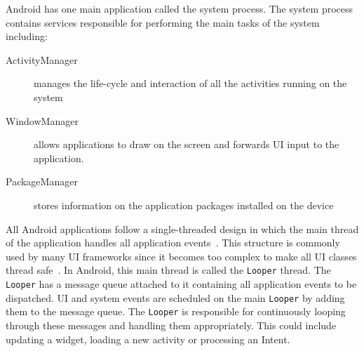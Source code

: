 \documentclass{acm_proc_article-sp}
\begin{document}
Android has one main application called the system process. The system process contains services responsible for performing the main
tasks of the system including:
\vspace{-10pt}
\begin{description}
 \item [ActivityManager] manages the life-cycle and interaction of all the activities running on the system
 \item [WindowManager] allows applications to draw on the screen and forwards UI input to the application.
 \item [PackageManager] stores information on the application packages installed on the device
\end{description}
\vspace{-5pt}
All Android applications follow a single-threaded design in which the main thread of the application handles all application
events~\cite{AndroidDocs}. This structure is commonly used by many UI frameworks since it becomes too complex to make all UI classes thread
safe~\cite{SingleThread}. In Android, this main thread is called the \texttt{Looper} thread. The \texttt{Looper} has a message queue
attached to it containing all application events to be dispatched. UI and system events are scheduled on the main \texttt{Looper} by adding
them to the message queue. The \texttt{Looper} is responsible for continuously looping through these messages and handling them
appropriately. This could include updating a widget, loading a new activity or processing an Intent.
\end{document}
